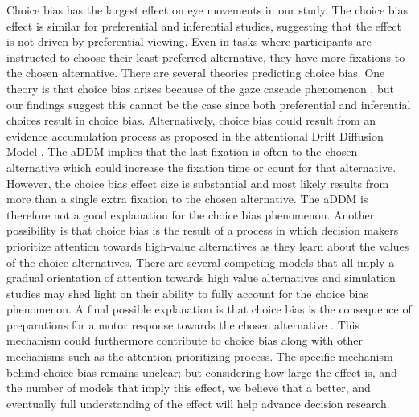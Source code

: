\documentclass[english,natbib,man,floatsintext]{apa6}
\begin{document}
Choice bias has the largest effect on eye movements in our study. The choice bias effect is similar for preferential and inferential studies, suggesting that the effect is not driven by preferential viewing. Even in tasks where participants are instructed to choose their least preferred alternative, they have more fixations to the chosen alternative. There are several theories predicting choice bias. One theory is that choice bias arises because of the gaze cascade phenomenon \citep{shimojo2003a}, but our findings suggest this cannot be the case since both preferential and inferential choices result in choice bias. Alternatively, choice bias could result from an evidence accumulation process as proposed in the attentional Drift Diffusion Model \citep{krajbich2010a}. The aDDM implies that the last fixation is often to the chosen alternative which could increase the fixation time or count for that alternative. However, the choice bias effect size is substantial and most likely results from more than a single extra fixation to the chosen alternative. The aDDM is therefore not a good explanation for the choice bias phenomenon. Another possibility is that choice bias is the result of a process in which decision makers prioritize attention towards high-value alternatives as they learn about the values of the choice alternatives. There are several competing models that all imply a gradual orientation of attention towards high value alternatives \citep{callaway2019a, gloeckner2011a, manohar2013} and simulation studies may shed light on their ability to fully account for the choice bias phenomenon. A final possible explanation is that choice bias is the consequence of preparations for a motor response towards the chosen alternative \citep{hayhoe2014a}. This mechanism could furthermore contribute to choice bias along with other mechanisms such as the attention prioritizing process. The specific mechanism behind choice bias remains unclear; but considering how large the effect is, and the number of models that imply this effect, we believe that a better, and eventually full understanding of the effect will help advance decision research.\\ 
\end{document}
